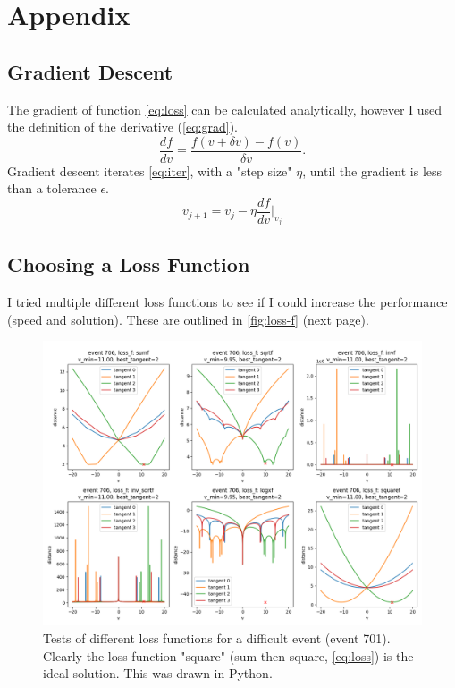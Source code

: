 \documentclass[11pt]{article}
\begin{document}
\appendix
\section{Appendix}
\subsection{Gradient Descent}
\label{app:gradient-descent}
The gradient of function \autoref{eq:loss} can be calculated analytically, however I used the definition of the derivative (\autoref{eq:grad}).
\begin{equation}
    \frac{df}{dv} = \frac{f(v + \delta v) - f(v)}{\delta v}.
    \label{eq:grad}
\end{equation}
Gradient descent iterates \autoref{eq:iter}, with a "step size" $\eta$, until the gradient is less than a tolerance $\epsilon$.
\begin{equation}
    v_{j+1} = v_j - \eta \frac{df}{dv}\Bigr|_{v_j}
    \label{eq:iter}
\end{equation}

\subsection{Choosing a Loss Function}
\label{app:loss-function}
I tried multiple different loss functions to see if I could increase the performance (speed and solution). These are outlined in \autoref{fig:loss-f} (next page).
\begin{figure}
    \centering
    \includegraphics[width=1\linewidth]{tex/loss_functions_f.png}
    \caption{Tests of different loss functions for a difficult event (event 701). Clearly the loss function "square" (sum then square, \autoref{eq:loss}) is the ideal solution. This was drawn in Python.}
    \label{fig:loss-f}
\end{figure}
\end{document}
